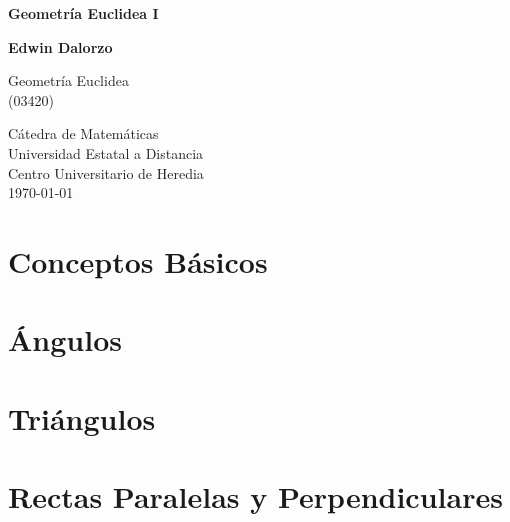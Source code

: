 \documentclass[12pt,titlepage]{article}
\theoremstyle{plain}%
\theoremstyle{definition}
\theoremstyle{remark}%
\begin{document}
\begin{titlepage}
   \begin{center}
       \vspace*{1cm}

       \Large \textbf{Geometría Euclidea I}

            
       \vspace{1.5cm}

       \textbf{Edwin Dalorzo}

       \vfill
            
       Geometría Euclidea \\
       (03420)
                   
       \vspace{0.8cm}
     

            
       Cátedra de Matemáticas \\ Universidad Estatal a Distancia \\ Centro Universitario de Heredia \\ \today \end{center}
\end{titlepage}

\clearpage
\tableofcontents
\clearpage

\section{Conceptos Básicos}


\clearpage

\section{Ángulos}


\clearpage

\section{Triángulos}


\clearpage

\section{Rectas Paralelas y Perpendiculares}

\end{document}
